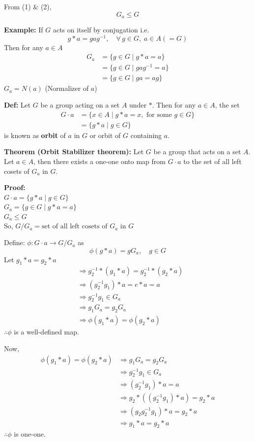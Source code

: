 \documentclass[11pt]{article}
\begin{document}
\noindent From (1) \& (2),
\[
G_a \le G
\]

\newpage
\noindent \textbf{Example:} If $G$ acts on itself by conjugation i.e.
\[
g * a = gag^{-1}, \quad \forall\, g \in G, \; a \in A (= G)
\]
Then for any $a \in A$
\begin{align*}
G_a &= \{g \in G \mid g * a = a\} \\
&= \{g \in G \mid gag^{-1} = a\} \\
&= \{g \in G \mid ga = ag\}
\end{align*}
$G_a = N(a)$ (Normalizer of $a$)

\bigskip
\noindent \textbf{Def:} Let $G$ be a group acting on a set $A$ under $*$. Then for any $a \in A$, the set
\begin{align*}
G \cdot a &= \{x \in A \mid g * a = x, \text{ for some } g \in G\} \\
&= \{g * a \mid g \in G\}
\end{align*}
is known as \textbf{orbit} of $a$ in $G$ or orbit of $G$ containing $a$.

\bigskip
\noindent \textbf{Theorem (Orbit Stabilizer theorem):} Let $G$ be a group that acts on a set $A$. Let $a \in A$, then there exists a one-one onto map from $G \cdot a$ to the set of all left cosets of $G_a$ in $G$.

\medskip
\noindent \textbf{Proof:} \\
$G \cdot a = \{g * a \mid g \in G\}$ \\
$G_a = \{g \in G \mid g * a = a\}$ \\
$G_a \le G$ \\
So, $G/G_a = \text{set of all left cosets of } G_a \text{ in } G$

\noindent Define: $\phi : G \cdot a \to G/G_a$ as
\[
\phi(g * a) = g G_a, \quad g \in G
\]
Let $g_1 * a = g_2 * a$
\begin{align*}
&\Rightarrow g_2^{-1} * (g_1 * a) = g_2^{-1} * (g_2 * a) \\
&\Rightarrow (g_2^{-1} g_1) * a = e * a = a \\
&\Rightarrow g_2^{-1} g_1 \in G_a \\
&\Rightarrow g_1 G_a = g_2 G_a \\
&\Rightarrow \phi(g_1 * a) = \phi(g_2 * a)
\end{align*}
$\therefore \phi$ is a well-defined map.

\newpage
\noindent Now,
\begin{align*}
\phi(g_1 * a) = \phi(g_2 * a) &\Rightarrow g_1 G_a = g_2 G_a \\
&\Rightarrow g_2^{-1} g_1 \in G_a \\
&\Rightarrow (g_2^{-1} g_1) * a = a \\
&\Rightarrow g_2 * ((g_2^{-1} g_1) * a) = g_2 * a \\
&\Rightarrow (g_2 g_2^{-1} g_1) * a = g_2 * a \\
&\Rightarrow g_1 * a = g_2 * a
\end{align*}
$\therefore \phi$ is one-one.
\end{document}
